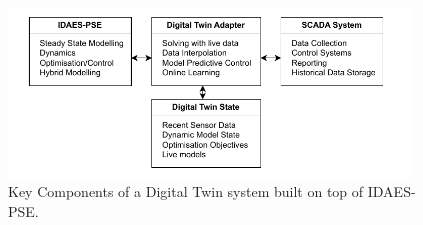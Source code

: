 \documentclass[12pt]{article}
\begin{document}

\begin{figure}[h]
    \centering
    \includegraphics[width=0.95\textwidth]{research_journal_framework_full.pdf}
    \caption{Key Components of a Digital Twin system built on top of IDAES-PSE.}
    \label{fig:theoretical_framework_full}
\end{figure}
\end{document}
